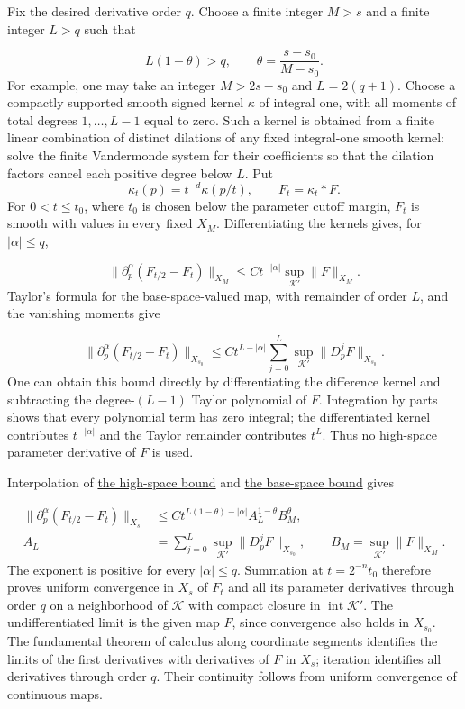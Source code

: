 \documentclass[
  english,
  11pt,
  reqno]{amsart}
\begin{document}
Fix the desired derivative order \(q\). Choose a finite integer \(M>s\)
and a finite integer \(L>q\) such that

\label{eq:online-parameter-finite-order-choice} \[
L(1-\theta)>q,
\qquad \theta=\frac{s-s_0}{M-s_0}.
\] For example, one may take an integer \(M>2s-s_0\) and \(L=2(q+1)\).
Choose a compactly supported smooth signed kernel \(\kappa\) of integral
one, with all moments of total degrees \(1,\ldots,L-1\) equal to zero.
Such a kernel is obtained from a finite linear combination of distinct
dilations of any fixed integral-one smooth kernel: solve the finite
Vandermonde system for their coefficients so that the dilation factors
cancel each positive degree below \(L\). Put \[
\kappa_t(p)=t^{-d}\kappa(p/t),\qquad F_t=\kappa_t*F.
\] For \(0<t\le t_0\), where \(t_0\) is chosen below the parameter
cutoff margin, \(F_t\) is smooth with values in every fixed \(X_M\).
Differentiating the kernels gives, for \(|\alpha|\le q\),

\label{eq:online-parameter-high-mollifier-bound} \[
\|\partial_p^\alpha(F_{t/2}-F_t)\|_{X_M}
 \le C t^{-|\alpha|}
                \sup_{\mathcal K'}\|F\|_{X_M}.
\] Taylor's formula for the base-space-valued map, with remainder of
order \(L\), and the vanishing moments give

\label{eq:online-parameter-base-mollifier-bound} \[
\|\partial_p^\alpha(F_{t/2}-F_t)\|_{X_{s_0}}
 \le C t^{L-|\alpha|}
       \sum_{j=0}^L\sup_{\mathcal K'}\|D_p^jF\|_{X_{s_0}}.
\] One can obtain this bound directly by differentiating the difference
kernel and subtracting the degree-\((L-1)\) Taylor polynomial of \(F\).
Integration by parts shows that every polynomial term has zero integral;
the differentiated kernel contributes \(t^{-|\alpha|}\) and the Taylor
remainder contributes \(t^L\). Thus no high-space parameter derivative
of \(F\) is used.

Interpolation of \hyperref[eq:online-parameter-high-mollifier-bound]{the
high-space bound} and
\hyperref[eq:online-parameter-base-mollifier-bound]{the base-space
bound} gives

\label{eq:online-parameter-summable-differences} \[
\begin{aligned}
\|\partial_p^\alpha(F_{t/2}-F_t)\|_{X_s}
 &\le C t^{L(1-\theta)-|\alpha|}
       A_L^{1-\theta}B_M^\theta,\\
A_L&=\sum_{j=0}^L\sup_{\mathcal K'}
                              \|D_p^jF\|_{X_{s_0}},\qquad
B_M=\sup_{\mathcal K'}\|F\|_{X_M}.
\end{aligned}
\] The exponent is positive for every \(|\alpha|\le q\). Summation at
\(t=2^{-n}t_0\) therefore proves uniform convergence in \(X_s\) of
\(F_t\) and all its parameter derivatives through order \(q\) on a
neighborhood of \(\mathcal K\) with compact closure in
\(\operatorname{int}\mathcal K'\). The undifferentiated limit is the
given map \(F\), since convergence also holds in \(X_{s_0}\). The
fundamental theorem of calculus along coordinate segments identifies the
limits of the first derivatives with derivatives of \(F\) in \(X_s\);
iteration identifies all derivatives through order \(q\). Their
continuity follows from uniform convergence of continuous maps.
\end{document}
